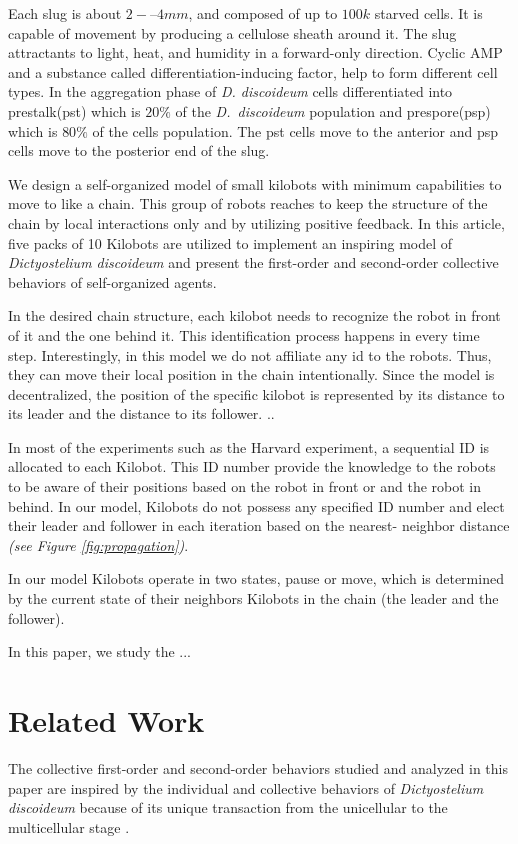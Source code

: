 \documentclass[11pt,a4paper]{article}
\begin{document}
Each slug is about $2-–4 mm$, and composed of up to $100k$ starved cells. It is capable of movement by producing a cellulose sheath around it. The slug attractants to light, heat, and humidity in a forward-only direction. Cyclic AMP and a substance called differentiation-inducing factor, help to form different cell types. In the aggregation phase of \textit{D. discoideum} cells differentiated into prestalk(pst) which is $20\%$ of the \textit{D.~discoideum} population and prespore(psp) which is $80\%$ of the cells population. The pst cells move to the anterior and psp cells move to the posterior end of the slug.

We design a self-organized model of small kilobots with minimum capabilities to move to like a chain. This group of robots reaches to keep the structure of the chain by local interactions only and by utilizing positive feedback.   In this article, five packs of 10 Kilobots are utilized to implement an inspiring model of \textit{Dictyostelium discoideum} and present the first-order and second-order collective behaviors of self-organized agents.  

In the desired chain structure, each kilobot needs to recognize the robot in front of it and the one behind it. This identification process happens in every time step. Interestingly, in this model we do not affiliate any id to the robots. Thus, they can move their local position in the chain intentionally. Since the model is decentralized, the position of the specific kilobot is represented by its distance to its leader and the distance to its follower. ..

In most of the experiments such as the Harvard experiment, a sequential ID  is allocated to each Kilobot. This ID number provide the knowledge to the robots to be aware of their positions based on the robot in front or and the robot in behind. In our model, Kilobots do not possess any specified ID number and elect their leader and follower in each iteration based on the nearest- neighbor distance \textit{(see Figure \ref{fig:propagation})}. 


In our model Kilobots operate in two states, pause or move, which is determined by the current state of their neighbors Kilobots in the chain (the leader and the follower). 

In this paper, we study the ...
\section{Related Work} 
The collective first-order and second-order behaviors studied and analyzed in this paper are inspired by the individual and collective behaviors of \textit{Dictyostelium discoideum} because of its unique transaction from the unicellular to the multicellular stage \cite{loomis2012dictyostelium, maeda2005regulation}. 
\end{document}
